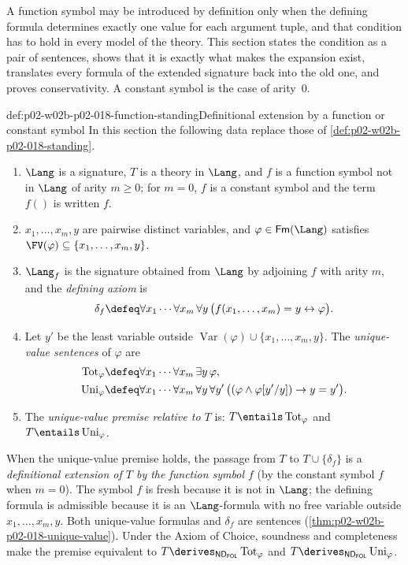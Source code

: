 A function symbol may be introduced by definition only when the defining
formula determines exactly one value for each argument tuple, and that
condition has to hold in every model of the theory.  This section states
the condition as a pair of sentences, shows that it is exactly what makes
the expansion exist, translates every formula of the extended signature
back into the old one, and proves conservativity.  A constant symbol is the
case of arity~0.

\begin{hbdefinition}{def:p02-w02b-p02-018-function-standing}{Definitional extension by a function or constant symbol}
In this section the following data replace those of
\cref{def:p02-w02b-p02-018-standing}.
\begin{enumerate}
 \item \(\Lang\) is a signature, \(T\) is a theory in \(\Lang\), and
       \(f\) is a function symbol not in \(\Lang\) of arity \(m\geq0\); for
       \(m=0\), \(f\) is a constant symbol and the term \(f()\) is written
       \(f\).
 \item \(x_1,\ldots,x_m,y\) are pairwise distinct variables, and
       \(\varphi\in\mathsf{Fm}(\Lang)\) satisfies
       \(\FV(\varphi)\subseteq\{x_1,\ldots,x_m,y\}\).
 \item \(\Lang_f\) is the signature obtained from \(\Lang\) by adjoining
       \(f\) with arity \(m\), and the \emph{defining axiom} is
       \[
        \delta_f\defeq\forall x_1\cdots\forall x_m\,\forall y\,
        \bigl(f(x_1,\ldots,x_m)=y\leftrightarrow\varphi\bigr).
       \]
 \item Let \(y'\) be the least variable outside
       \(\operatorname{Var}(\varphi)\cup\{x_1,\ldots,x_m,y\}\).  The
       \emph{unique-value sentences} of \(\varphi\) are
       \[
        \begin{aligned}
         \operatorname{Tot}_{\varphi}&\defeq
          \forall x_1\cdots\forall x_m\,\exists y\,\varphi,\\
         \operatorname{Uni}_{\varphi}&\defeq
          \forall x_1\cdots\forall x_m\,\forall y\,\forall y'\,
          \bigl((\varphi\land\varphi[y'/y])\to y=y'\bigr).
        \end{aligned}
       \]
 \item The \emph{unique-value premise relative to \(T\)} is:
       \(T\entails\operatorname{Tot}_{\varphi}\) and
       \(T\entails\operatorname{Uni}_{\varphi}\).
\end{enumerate}
When the unique-value premise holds, the passage from \(T\) to
\(T\cup\{\delta_f\}\) is a \emph{definitional extension of \(T\) by the
function symbol \(f\)} (by the constant symbol \(f\) when \(m=0\)).  The
symbol \(f\) is fresh because it is not in \(\Lang\); the defining formula
is admissible because it is an \(\Lang\)-formula with no free variable
outside \(x_1,\ldots,x_m,y\).  Both unique-value formulas and \(\delta_f\)
are sentences (\cref{thm:p02-w02b-p02-018-unique-value}).  Under the
Axiom of Choice, soundness and completeness make the premise equivalent
to \(T\derives_{\mathsf{ND}_{\mathsf{FOL}}}\operatorname{Tot}_{\varphi}\)
and \(T\derives_{\mathsf{ND}_{\mathsf{FOL}}}\operatorname{Uni}_{\varphi}\).
\end{hbdefinition}

